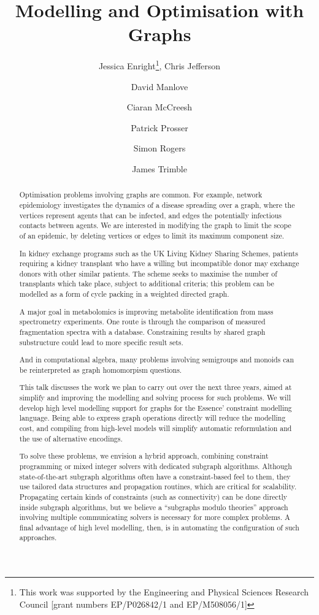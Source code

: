 \documentclass{llncs}
\title{Modelling and Optimisation with Graphs}
\author{
    Jessica Enright\inst{1}\thanks{This work was supported by the Engineering and Physical Sciences
    Research Council [grant numbers EP/P026842/1 and EP/M508056/1]},
    Chris Jefferson\inst{2}\samethanks[1] \and
    David Manlove\inst{3} \and
    Ciaran McCreesh\inst{3}\samethanks[1] \and
    Patrick Prosser\inst{3}\samethanks[1] \and
    Simon Rogers \inst{3} \and
    James Trimble\inst{3}\samethanks[1]
}
\institute{
    University of Stirling, Stirling, Scotland \and
    University of St Andrews, St Andrews, United Kingdom \and
    University of Glasgow, Glasgow, Scotland}
\begin{document}
\maketitle

\begin{abstract}
    Optimisation problems involving graphs are common. For example, network epidemiology
    investigates the dynamics of a disease spreading over a graph, where the vertices represent
    agents that can be infected, and edges the potentially infectious contacts between agents.  We
    are interested in modifying the graph to limit the scope of an epidemic, by deleting vertices or
    edges to limit its maximum component size.

    In kidney exchange programs such as the UK Living Kidney Sharing Schemes, patients requiring a
    kidney transplant who have a willing but incompatible donor may exchange donors with other
    similar patients. The scheme seeks to maximise the number of transplants which take place,
    subject to additional criteria; this problem can be modelled as a form of cycle packing in a
    weighted directed graph.

    A major goal in metabolomics is improving metabolite identification from mass spectrometry
    experiments. One route is through the comparison of measured fragmentation spectra with a
    database. Constraining results by shared graph substructure could lead to more specific result
    sets.

    And in computational algebra, many problems involving semigroups and monoids can be
    reinterpreted as graph homomorpism questions.

    This talk discusses the work we plan to carry out over the next three years, aimed at simplify
    and improving the modelling and solving process for such problems.  We will develop high level
    modelling support for graphs for the Essence' constraint modelling language.  Being able to
    express graph operations directly will reduce the modelling cost, and compiling from high-level
    models will simplify automatic reformulation and the use of alternative encodings.

    To solve these problems, we envision a hybrid approach, combining constraint programming or
    mixed integer solvers with dedicated subgraph algorithms. Although state-of-the-art subgraph
    algorithms often have a constraint-based feel to them, they use tailored data structures and
    propagation routines, which are critical for scalability. Propagating certain kinds of
    constraints (such as connectivity) can be done directly inside subgraph algorithms, but we
    believe a ``subgraphs modulo theories'' approach involving multiple communicating solvers is
    necessary for more complex problems. A final advantage of high level modelling, then, is in
    automating the configuration of such approaches.
\end{abstract}
\end{document}
